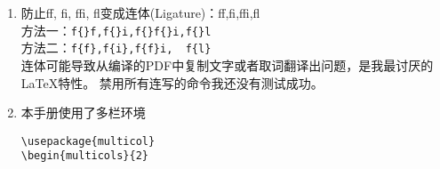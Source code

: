 \documentclass{article}
\begin{document}
\begin{multicols}{2}
\begin{enumerate}
\item 防止f{}f, f{}i, f{}f{}i, f{}l变成连体(Ligature)：ff,fi,ffi,fl\\
方法一：\verb|f{}f,f{}i,f{}f{}i,f{}l| \\
方法二：\verb|f{f},f{i},f{f}i,  f{l}| \\
连体可能导致从编译的PDF中复制文字或者取词翻译出问题，是我最讨厌的\LaTeX 特性。
禁用所有连写的命令我还没有测试成功。


\item 本手册使用了多栏环境
\begin{lstlisting}  
\usepackage{multicol}      
\begin{multicols}{2} 


\end{lstlisting}
\end{enumerate}
\end{multicols}
\end{document}
